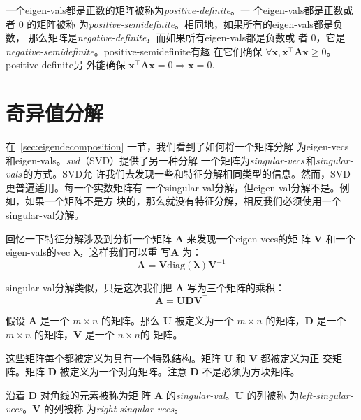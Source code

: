 一个\gls*{eigen-vals}都是正数的矩阵被称为\emph{\gls{positive-definite}}。一
个\gls*{eigen-vals}都是正数或者 $0$ 的矩阵被称
为\emph{\gls{positive-semidefinite}}。相同地，如果所有的\gls*{eigen-vals}都是负数，
那么矩阵是\emph{\gls{negative-definite}}，而如果所有\gls*{eigen-vals}都是负数或
者 $0$，它是\emph{\gls{negative-semidefinite}}。\gls*{positive-semidefinite}有趣
在它们确保
$\forall\pmb{x}, \pmb{x}^{\top}\pmb{A}\pmb{x} \geq 0$。\gls*{positive-definite}另
外能确保 $\pmb{x}^{\top}\pmb{A}\pmb{x} = 0 \Rightarrow \pmb{x} = 0$.

\section{奇异值分解}
\label{sec:singular_value_decomposition}

在~\ref{sec:eigendecomposition} 一节，我们看到了如何将一个矩阵分解
为\gls*{eigen-vecs} 和\gls*{eigen-vals}。\emph{\gls{svd}}（SVD）提供了另一种分解
一个矩阵为\emph{\gls{singular-vecs}}\,和\emph{\gls{singular-vals}}\,的方式。SVD允
许我们去发现一些和特征分解相同类型的信息。然而，SVD 更普遍适用。每一个实数矩阵有
一个\gls*{singular-val}分解，但\gls*{eigen-val}分解不是。例如，如果一个矩阵不是方
块的，那么就没有特征分解，相反我们必须使用一个\gls*{singular-val}分解。

回忆一下特征分解涉及到分析一个矩阵 $\pmb{A}$ 来发现一个\gls*{eigen-vecs}的矩
阵 $\pmb{V}$ 和一个\gls*{eigen-vals}的\gls*{vec} $\pmb{\lambda}$，这样我们可以重
写$\pmb{A}$ 为：
\begin{equation}
  \pmb{A} = \pmb{V}\mathrm{diag}(\pmb{\lambda})\pmb{V}^{-1}
\end{equation}

\gls*{singular-val}分解类似，只是这次我们把 $\pmb{A}$ 写为三个矩阵的乘积：
\begin{equation}
  \pmb{A} = \pmb{U}\pmb{D}\pmb{V}^{\top}
\end{equation}

假设 $\pmb{A}$ 是一个 $m \times n$ 的矩阵。那么 $\pmb{U}$ 被定义为一个 $m \times
n$ 的矩阵，$\pmb{D}$ 是一个 $m \times n$ 的矩阵，$\pmb{V}$ 是一个 $n \times n$的
矩阵。

这些矩阵每个都被定义为具有一个特殊结构。矩阵 $\pmb{U}$ 和 $\pmb{V}$ 都被定义为正
交矩阵。矩阵 $\pmb{D}$ 被定义为一个对角矩阵。注意 $\pmb{D}$ 不是必须为方块矩阵。

沿着 $\pmb{D}$ 对角线的元素被称为矩
阵 $\pmb{A}$ 的\emph{\gls{singular-val}}。$\pmb{U}$ 的列被称
为\emph{\gls{left-singular-vecs}}。$\pmb{V}$ 的列被称
为\emph{\gls{right-singular-vecs}}。

